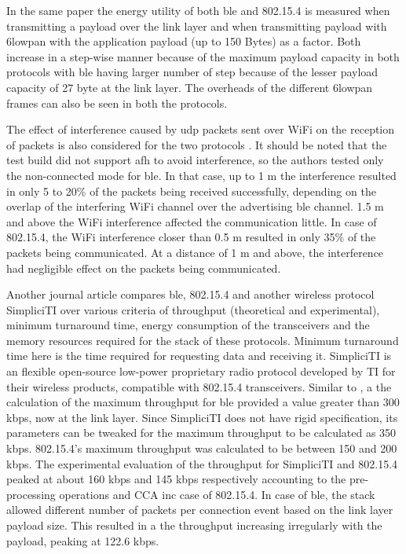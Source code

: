 In the same paper \cite{Siekkinen2012} the energy utility of both \gls{ble} and 802.15.4 is measured when transmitting a payload over the link layer and when transmitting payload with \gls{6lowpan} with the application payload (up to 150 Bytes) as a factor. Both increase in a step-wise manner because of the maximum payload capacity in both protocols with \gls{ble} having larger number of step because of the lesser payload capacity of 27 byte at the link layer. The overheads of the different \gls{6lowpan} frames can also be seen in both the protocols. 

The effect of interference caused by \gls{udp} packets sent over WiFi on the reception of packets is also considered for the two protocols \cite{Siekkinen2012}. It should be noted that the test build did not support \gls{afh} to avoid interference, so the authors tested only the non-connected mode for \gls{ble}. In that case, up to 1 m the interference resulted in only 5 to 20\% of the packets being received successfully, depending on the overlap of the interfering WiFi channel over the advertising \gls{ble} channel. 1.5 m and above the WiFi interference affected the communication little. In case of 802.15.4, the WiFi interference closer than 0.5 m resulted in only 35\% of the packets being communicated. At a distance of 1 m and above, the interference had negligible effect on the packets being communicated.

Another journal article \cite{Mikhaylov2013} compares \gls{ble}, 802.15.4 and another wireless protocol SimpliciTI over various criteria of throughput (theoretical and experimental), minimum turnaround time, energy consumption of the transceivers and the memory resources required for the stack of these protocols. Minimum turnaround time here is the time required for requesting data and receiving it. SimpliciTI is an flexible open-source low-power proprietary radio protocol developed by TI for their wireless products, compatible with 802.15.4 transceivers. Similar to \cite{Gomez2011}, a the calculation of the maximum throughput for \gls{ble} provided a value greater than 300 kbps, now at the link layer. Since SimpliciTI does not have rigid specification, its parameters can be tweaked for the maximum throughput to be calculated as 350 kbps. 802.15.4's maximum throughput was calculated to be between 150 and 200 kbps. The experimental evaluation of the throughput for SimpliciTI and 802.15.4 peaked at about 160 kbps and 145 kbps respectively accounting to the pre-processing operations and CCA inc case of 802.15.4. In case of \gls{ble}, the stack allowed different number of packets per connection event based on the link layer payload size. This resulted in a the throughput increasing irregularly with the payload, peaking at 122.6 kbps.

